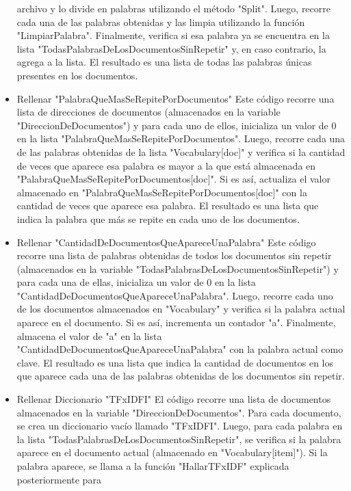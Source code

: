 \documentclass{article}
\begin{document}
\begin{itemize}
    archivo y lo divide en palabras utilizando el método "Split". 
    Luego, recorre cada una de las palabras obtenidas y las limpia utilizando la 
    función "LimpiarPalabra". 
    Finalmente, verifica si esa palabra ya se encuentra en la lista 
    "TodasPalabrasDeLosDocumentosSinRepetir" y, en caso contrario, la agrega a 
    la lista. 
    El resultado es una lista de todas las palabras únicas presentes en los 
    documentos. 
    \item Rellenar "PalabraQueMasSeRepitePorDocumentos" 
    Este código recorre una lista de direcciones de documentos (almacenados en 
    la variable "DireccionDeDocumentos") y para cada uno de ellos, inicializa un 
    valor de 0 en la lista "PalabraQueMasSeRepitePorDocumentos". 
    Luego, recorre cada una de las palabras obtenidas de la lista "Vocabulary[doc]" 
    y verifica si la cantidad de veces que aparece esa palabra es mayor a la que 
    está almacenada en "PalabraQueMasSeRepitePorDocumentos[doc]". 
    Si es así, actualiza el valor almacenado en 
    "PalabraQueMasSeRepitePorDocumentos[doc]" con la cantidad de veces que 
    aparece esa palabra. 
    El resultado es una lista que indica la palabra que más se repite en cada uno 
    de los documentos.
    \item Rellenar "CantidadDeDocumentosQueApareceUnaPalabra" 
    Este código recorre una lista de palabras obtenidas de todos los documentos 
    sin repetir (almacenados en la variable 
    "TodasPalabrasDeLosDocumentosSinRepetir") y para cada una de ellas, 
    inicializa un valor de 0 en la lista 
    "CantidadDeDocumentosQueApareceUnaPalabra". 
    Luego, recorre cada uno de los documentos almacenados en "Vocabulary" y 
    verifica si la palabra actual aparece en el documento. Si es así, incrementa un 
    contador "a". 
    Finalmente, almacena el valor de "a" en la lista 
    "CantidadDeDocumentosQueApareceUnaPalabra" con la palabra actual como 
    clave. 
    El resultado es una lista que indica la cantidad de documentos en los que 
    aparece cada una de las palabras obtenidas de los documentos sin repetir.
    \item Rellenar Diccionario "TFxIDFI" 
    El código recorre una lista de documentos almacenados en la variable 
    "DireccionDeDocumentos". Para cada documento, se crea un diccionario vacío 
    llamado "TFxIDFI". 
    Luego, para cada palabra en la lista 
    "TodasPalabrasDeLosDocumentosSinRepetir", se verifica si la palabra aparece 
    en el documento actual (almacenado en "Vocabulary[item]"). Si la palabra 
    aparece, se llama a la función "HallarTFxIDF" explicada posteriormente para 

\end{itemize}
\end{document}
